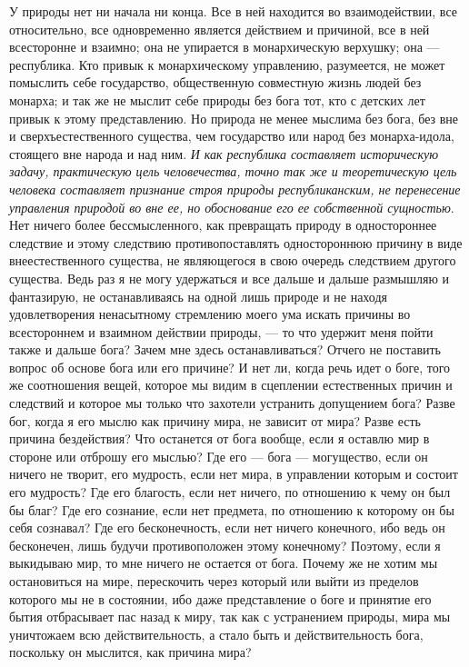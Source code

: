 \documentclass[12pt]{article}
\begin{document}
У природы нет ни начала ни конца. Все в ней находится во взаимодействии, все относительно, все одновременно является действием и причиной, все в ней всесторонне и взаимно; она не упирается в монархическую верхушку; она --- республика. Кто привык к монархическому управлению, разумеется, не может помыслить себе государство, общественную совместную жизнь людей без монарха; и так же не мыслит себе природы без бога тот, кто с детских лет привык к этому представлению. Но природа не менее мыслима без бога, без вне и сверхъестественного существа, чем государство или народ без монарха-идола, стоящего вне народа и над ним. \emph{И как республика составляет историческую задачу, практическую цель человечества, точно так же и теоретическую цель человека составляет признание строя природы республиканским, не перенесение управления природой во вне ее, но обоснование его ее собственной сущностью}. Нет ничего более бессмысленного, как превращать природу в одностороннее следствие и этому следствию противопоставлять одностороннюю причину в виде внеестественного существа, не являющегося в свою очередь следствием другого существа. Ведь раз я не могу удержаться и все дальше и дальше размышляю и фантазирую, не останавливаясь на одной лишь природе и не находя удовлетворения ненасытному стремлению моего ума искать причины во всестороннем и взаимном действии природы, --- то что удержит меня пойти также и дальше бога? Зачем мне здесь останавливаться? Отчего не поставить вопрос об основе бога или его причине? И нет ли, когда речь идет о боге, того же соотношения вещей, которое мы видим в сцеплении естественных причин и следствий и которое мы только что захотели устранить допущением бога? Разве бог, когда я его мыслю как причину мира, не зависит от мира? Разве есть причина бездействия? Что останется от бога вообще, если я оставлю мир в стороне или отброшу его мыслью? Где его --- бога --- могущество, если он ничего не творит, его мудрость, если нет мира, в управлении которым и состоит его мудрость? Где его благость, если нет ничего, по отношению к чему он был бы благ? Где его сознание, если нет предмета, по отношению к которому он бы себя сознавал? Где его бесконечность, если нет ничего конечного, ибо ведь он бесконечен, лишь будучи противоположен этому конечному? Поэтому, если я выкидываю мир, то мне ничего не остается от бога. Почему же не хотим мы остановиться на мире, перескочить через который или выйти из пределов которого мы не в состоянии, ибо даже представление о боге и принятие его бытия отбрасывает пас назад к миру, так как с устранением природы, мира мы уничтожаем всю действительность, а стало быть и действительность бога, поскольку он мыслится, как причина мира? 
\end{document}
